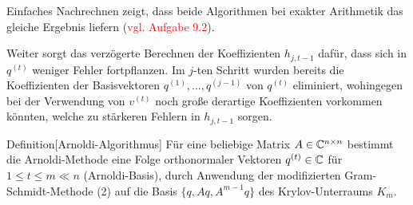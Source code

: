 
Einfaches Nachrechnen zeigt, dass beide Algorithmen bei exakter Arithmetik das
gleiche Ergebnis liefern (\textcolor{red}{vgl. Aufgabe 9.2}).

Weiter sorgt das verzögerte Berechnen der Koeffizienten $h_{j,t-1}$ dafür, dass sich in $q^{(t)}$ weniger 
Fehler fortpflanzen. Im $j$-ten Schritt wurden bereits die Koeffizienten der Basisvektoren $q^{(1)},\dots,q^{(j-1)}$ 
von $q^{(t)}$ eliminiert, wohingegen bei der Verwendung von $v^{(t)}$ noch große derartige Koeffizienten
vorkommen könnten, welche zu stärkeren Fehlern in $h_{j,t-1}$ sorgen.

\begin{colbox}{Definition}[Arnoldi-Algorithmus] 
  Für eine beliebige Matrix $A\in\mathbb C  ^{n\times n}$ bestimmt die Arnoldi-Methode eine Folge orthonormaler 
  Vektoren $q^{(t)}\in\mathbb C  $ für $1\leq t \leq m \ll n$ (Arnoldi-Basis), durch Anwendung der modifizierten 
  Gram-Schmidt-Methode (2) auf die Basis $\{q,Aq,A^{m-1}q\}$ des Krylov-Unterraums $K_m$.
\end{colbox}

